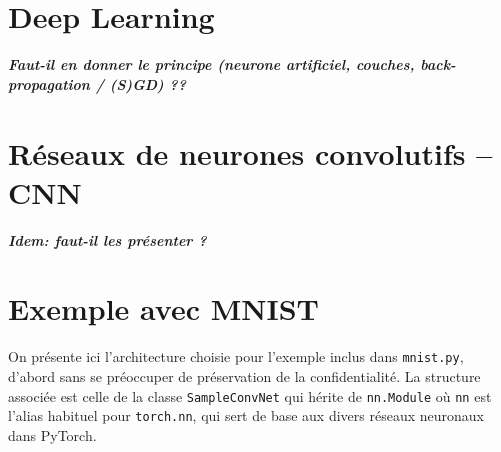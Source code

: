 \documentclass[a4paper,11pt]{article} %
\newcommand{\ttt}[1]{\texttt{#1}}
\begin{document}
\section{Deep Learning}
\emph{\textbf{Faut-il en donner le principe (neurone artificiel, couches, back-propagation / (S)GD) ??}}
\section{Réseaux de neurones convolutifs -- CNN}
\emph{\textbf{Idem: faut-il les présenter ?}}
\section{Exemple avec MNIST}
On présente ici l'architecture choisie pour l'exemple inclus dans \ttt{mnist.py}, d'abord sans se préoccuper de préservation de la confidentialité. La structure associée est celle de la classe \ttt{SampleConvNet} qui hérite de \ttt{nn.Module} où \ttt{nn} est l'alias habituel pour \ttt{torch.nn}, qui sert de base aux divers réseaux neuronaux dans \textsf{PyTorch}.
\end{document}
